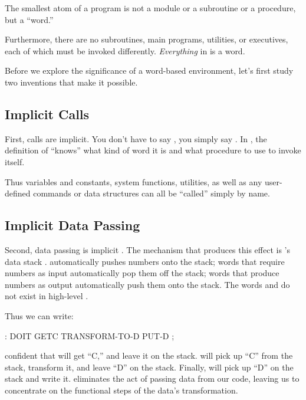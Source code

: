 \begin{tfquot}
The smallest atom of a \Forth{} program is not a module or a subroutine
or a procedure, but a ``word.''
\end{tfquot}
Furthermore, there are no subroutines, main programs, utilities, or
executives, each of which must be invoked differently.
\emph{Everything} in \Forth{} is a word.

Before we explore the significance of a word-based environment, let's
first study two \Forth{} inventions that make it possible.


\subsection{Implicit Calls}%
%
%
First, calls are implicit. You don't have to say ,
you simply say . In \Forth{}, the definition of
 ``knows'' what kind of word it is and what procedure to
use to invoke itself.

Thus variables and constants, system functions, utilities, as well
as any user-defined commands or data structures can all be ``called''
simply by name.%
%
%


\subsection{Implicit Data Passing}%
%
Second, data passing is implicit%
.
The mechanism that produces this effect is \Forth{}'s data stack%
.
\Forth{} automatically pushes numbers onto the stack; words that require
numbers as input automatically pop them off the stack; words that
produce numbers as output automatically push them onto the stack. The
words  and  do not exist in high-level \Forth{}.

Thus we can write:
\begin{Code}
: DOIT
    GETC  TRANSFORM-TO-D  PUT-D ;
\end{Code}
confident that  will get ``C,'' and leave it on the stack.
 will pick up ``C'' from the stack, transform
it, and leave ``D'' on the stack. Finally,  will pick up
``D'' on the stack and write it. \Forth{} eliminates the act of passing
data from our code, leaving us to concentrate on the functional steps
of the data's transformation.


